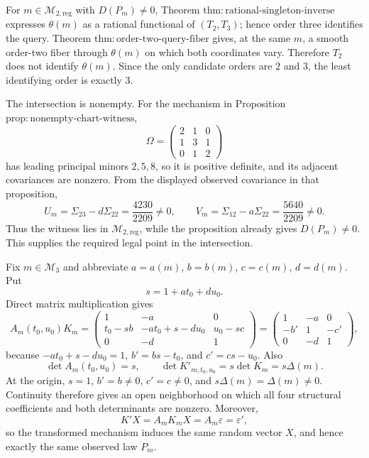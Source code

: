 For \(m\in\mathcal M_{2,\mathrm{reg}}\) with \(D(P_m)\neq0\), Theorem \(\mathrm{thm:rational\mbox{-}singleton\mbox{-}inverse}\) expresses \(\theta(m)\) as a rational functional of \((T_2,T_3)\); hence order three identifies the query. Theorem \(\mathrm{thm:order\mbox{-}two\mbox{-}query\mbox{-}fiber}\) gives, at the same \(m\), a smooth order-two fiber through \(\theta(m)\) on which both coordinates vary. Therefore \(T_2\) does not identify \(\theta(m)\). Since the only candidate orders are \(2\) and \(3\), the least identifying order is exactly \(3\).

The intersection is nonempty. For the mechanism in Proposition \(\mathrm{prop:nonempty\mbox{-}chart\mbox{-}witness}\),
\[
\Omega=
\begin{pmatrix}2&1&0\\1&3&1\\0&1&2\end{pmatrix}
\]
has leading principal minors \(2,5,8\), so it is positive definite, and its adjacent covariances are nonzero. From the displayed observed covariance in that proposition,
\[
U_m=\Sigma_{23}-d\Sigma_{22}=\frac{4230}{2209}\neq0,
\qquad
V_m=\Sigma_{12}-a\Sigma_{22}=\frac{5640}{2209}\neq0.
\]
Thus the witness lies in \(\mathcal M_{2,\mathrm{reg}}\), while the proposition already gives \(D(P_m)\neq0\). This supplies the required legal point in the intersection.

Fix \(m\in\mathcal M_3\) and abbreviate \(a=a(m)\), \(b=b(m)\), \(c=c(m)\), \(d=d(m)\). Put
\[
s=1+at_0+du_0.
\]
Direct matrix multiplication gives
\[
A_m(t_0,u_0)K_m=
\begin{pmatrix}
1&-a&0\\
t_0-sb&-at_0+s-du_0&u_0-sc\\
0&-d&1
\end{pmatrix}
=
\begin{pmatrix}
1&-a&0\\
-b'&1&-c'\\
0&-d&1
\end{pmatrix},
\]
because \(-at_0+s-du_0=1\), \(b'=bs-t_0\), and \(c'=cs-u_0\). Also
\[
\det A_m(t_0,u_0)=s,
\qquad
\det K'_{m,t_0,u_0}=s\det K_m=s\Delta(m).
\]
At the origin, \(s=1\), \(b'=b\neq0\), \(c'=c\neq0\), and \(s\Delta(m)=\Delta(m)\neq0\). Continuity therefore gives an open neighborhood on which all four structural coefficients and both determinants are nonzero. Moreover,
\[
K'X=A_mK_mX=A_m\varepsilon=\varepsilon',
\]
so the transformed mechanism induces the same random vector \(X\), and hence exactly the same observed law \(P_m\).

